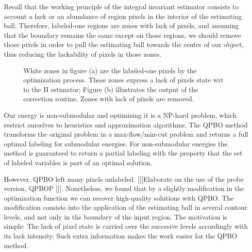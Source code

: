\documentclass[runningheads]{llncs}
\begin{document}
	
	Recall that the working principle of the integral invariant estimator consists to account a lack or an abundance of region pixels in the interior of the estimating ball. Therefore, labeled-one regions are zones with lack of pixels, and assuming that the boundary remains the same except on those regions, we should remove those pixels in order to pull the estimating ball towards the center of our object, thus reducing the lackability of pixels in those zones.


	\begin{figure}[!ht]
		\center
		\hspace{80pt}
		\caption{White zones in figure (a) are the labeled-one pixels by the optimization process. These zones express a lack of pixels state wrt to the II estimator; Figure (b) illustrates the output of the correction routine. Zones with lack of pixels are removed.   }				
	\end{figure}
	
	
	Our energy is non-submodular and optimizing it is a NP-hard problem, which restrict ourselves to heuristics and approximation algorithms. The QPBO method \cite{kolmogorov07} transforms the original problem in a max-flow/min-cut problem and returns a full optimal labeling for submodular energies. For non-submodular energies the method is guaranteed to return a partial labeling with the property that the set of labeled variables is part of an optimal solution. 
	
	However, QPBO left many pixels unlabeled. [[[Elaborate on the use of the probe version, QPBOP \cite{rother07}]]]. Nonetheless, we found that by a slightly modification in the optimization function we can recover high-quality solutions with QPBO. The modification consists into the application of the estimating ball in several contour levels, and not only in the boundary of the input region. The motivation is simple: The lack of pixel state is carried over the succesive levels accordingly with its lack intensity. Such extra information makes the work easier for the QPBO method.
	
\end{document}
